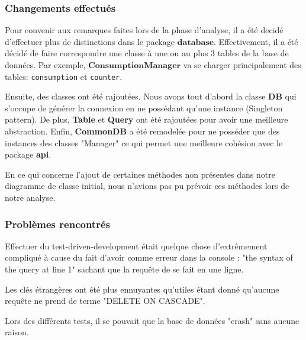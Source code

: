 \subsubsection{Changements effectués}
\begin{flushleft}
    Pour convenir aux remarques faites lors de la phase d'analyse, il a été decidé d'effectuer plus de distinctions dans le package $\mathbf{database}$. Effectivement, il a été décidé de faire correspondre une classe à une ou au plus 3 tables de la base de données. Par exemple, $\mathbf{ConsumptionManager}$ va se charger principalement des tables: \texttt{consumption} et \texttt{counter}.
\end{flushleft}
\begin{flushleft}
    Ensuite, des classes ont été rajoutées. Nous avons tout d'abord la classe \textbf{DB} qui s'occupe de générer la connexion en ne possédant qu'une instance (Singleton pattern). De plus, \textbf{Table} et \textbf{Query} ont été rajoutées pour avoir une meilleure abstraction. Enfin, \textbf{CommonDB} a été remodelée pour ne posséder que des instances des classes "Manager" ce qui permet une meilleure cohésion avec le package \textbf{api}.
\end{flushleft}
\begin{flushleft}
    En ce qui concerne l'ajout de certaines méthodes non présentes dans notre diagramme de classe initial, nous n'avions pas pu prévoir ces méthodes lors de notre analyse.
\end{flushleft}

\subsubsection{Problèmes rencontrés}
\begin{flushleft}
    Effectuer du test-driven-development était quelque chose d'extrêmement compliqué à cause du fait d'avoir comme erreur dans la console : "the syntax of the query at line 1" sachant que la requête de se fait en une ligne. 
\end{flushleft}
\begin{flushleft}
    Les clés étrangères ont été plus ennuyantes qu'utiles étant donné qu'aucune requête ne prend de terme "DELETE ON CASCADE".
\end{flushleft}
\begin{flushleft}
    Lors des différents tests, il se pouvait que la base de données "crash" sans aucune raison.
\end{flushleft}

